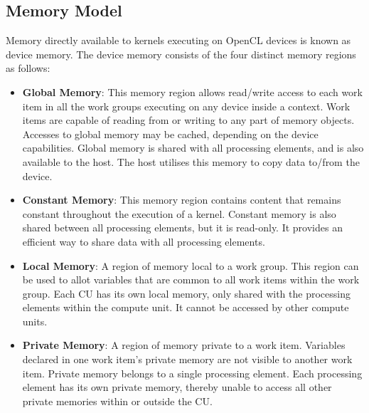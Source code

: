 \subsection{Memory Model}
Memory directly available to kernels executing on OpenCL devices is known as device memory. The device memory consists of the four distinct memory regions as follows: 
\begin{itemize}
\item \textbf{Global Memory}: This memory region allows read/write access to each work item in all the work groups executing on any device inside a context. Work items are capable of reading from or writing to any part of memory objects. Accesses to global memory may be cached, depending on the device capabilities. \newline\newline
Global memory is shared with all processing elements, and is also available to the host. The host utilises this memory to copy data to/from the device.

\item \textbf{Constant Memory}: This memory region contains content that remains constant throughout the execution of a kernel. \newline\newline
Constant memory is also shared between all processing elements, but it is read-only. It provides an efficient way to share data with all processing elements.

\item \textbf{Local Memory}: A region of memory local to a work group. This region can be used to allot variables that are common to all work items within the work group.\newline\newline
Each CU has its own local memory, only shared with the processing elements within the compute unit. It cannot be accessed by other compute units. 

\item \textbf{Private Memory}: A region of memory private to a work item. Variables declared in one work item’s private memory are not visible to another work item.\newline\newline
Private memory belongs to a single processing element. Each processing element has its own private memory, thereby unable to access all other private memories within or outside the CU.


\end{itemize}

